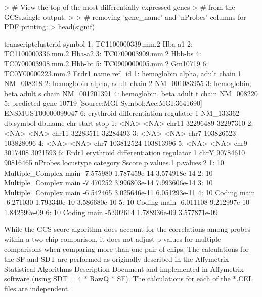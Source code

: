 \documentclass[12pt]{article}
\begin{document}
\begin{Schunk}
\begin{Sinput}
> # View the top of the most differentially expressed genes
> # from the GCSs.single output:
> 
> # removing 'gene_name' and 'nProbes' columns for PDF printing:
> head(signif)
\end{Sinput}
\begin{Soutput}
   transcriptclusterid  symbol
1:   TC1100000339.mm.2  Hba-a1
2:   TC1100000336.mm.2  Hba-a2
3:   TC0700003909.mm.2  Hbb-bs
4:   TC0700003908.mm.2  Hbb-bt
5:   TC0900000005.mm.2 Gm10719
6:   TC0Y00000223.mm.2   Erdr1
                                                       name             ref_id
1:                          hemoglobin alpha, adult chain 1          NM_008218
2:                          hemoglobin alpha, adult chain 2       NM_001083955
3:                           hemoglobin, beta adult s chain       NM_001201391
4:                           hemoglobin, beta adult t chain          NM_008220
5: predicted gene 10719 [Source:MGI Symbol;Acc:MGI:3641690] ENSMUST00000099047
6:                    erythroid differentiation regulator 1          NM_133362
   db.symbol                               db.name   chr     start      stop
1:      <NA>                                  <NA> chr11  32296489  32297310
2:      <NA>                                  <NA> chr11  32283511  32284493
3:      <NA>                                  <NA>  chr7 103826523 103828096
4:      <NA>                                  <NA>  chr7 103812524 103813996
5:      <NA>                                  <NA>  chr9   3017408   3021593
6:     Erdr1 erythroid differentiation regulator 1  chrY  90784610  90816465
   nProbes        locustype category    Sscore   p.values.1   p.values.2
1:      10 Multiple_Complex     main -7.575980 1.787459e-14 3.574918e-14
2:      10 Multiple_Complex     main -7.470252 3.996803e-14 7.993606e-14
3:      10 Multiple_Complex     main -6.542465 3.025646e-11 6.051293e-11
4:      10           Coding     main -6.271030 1.793340e-10 3.586680e-10
5:      10           Coding     main -6.011108 9.212997e-10 1.842599e-09
6:      10           Coding     main -5.902614 1.788936e-09 3.577871e-09
\end{Soutput}
\end{Schunk}

While the GCS-score algorithm does account for the correlations among probes within a two-chip comparison, it does not adjust p-values for multiple comparisons when comparing more than one pair of chips.  The calculations for the SF and SDT are performed as originally described in the Affymetrix Statistical Algorithms Description Document \citep{affy:tech:2002} and implemented in Affymetrix software (using SDT = 4 * RawQ * SF). The calculations for each of the *.CEL files are independent.
\end{document}
